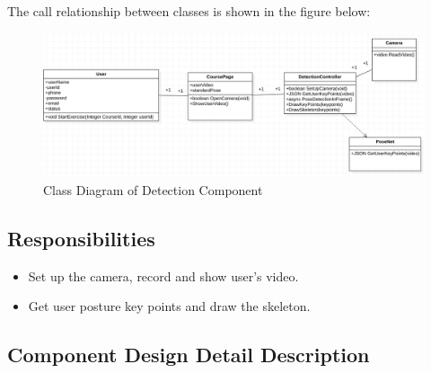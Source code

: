\documentclass[16pt]{scrreprt}
\begin{document}
\noindent The call relationship between classes is shown in the figure below:
\begin{figure}[H]
	\centering
	\includegraphics[width=1.0\textwidth]{diagrams/detection.png}
	\caption{Class Diagram of Detection Component}
\end{figure}
\subsection{Responsibilities}
\begin{itemize}
	\item Set up the camera, record and show user's video.
	\item Get user posture key points and draw the skeleton. 
\end{itemize}

\subsection{Component Design Detail Description}
\end{document}
